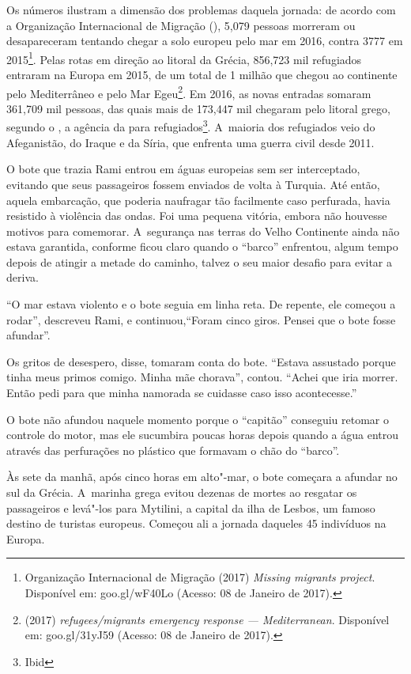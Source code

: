 Os números ilustram a dimensão dos problemas daquela jornada: de acordo
com a Organização Internacional de Migração (), 5,079 pessoas
morreram ou desapareceram tentando chegar a solo europeu pelo mar em
2016, contra 3777 em 2015\footnote{ Organização Internacional de Migração (2017)
\emph{Missing migrants project}. Disponível em:
{goo.gl/wF40Lo}
(Acesso: 08 de Janeiro de 2017).}. Pelas rotas em direção ao
litoral da Grécia, 856,723 mil refugiados entraram na Europa em 2015, de
um total de 1 milhão que chegou ao continente pelo Mediterrâneo e pelo
Mar Egeu\footnote{  (2017) \emph{ refugees/migrants emergency
response --- Mediterranean}. Disponível em:
goo.gl/31yJ59
(Acesso: 08 de Janeiro
de 2017).}. Em 2016, as novas entradas somaram 361,709
mil pessoas, das quais mais de 173,447 mil chegaram pelo litoral grego,
segundo o , a agência da  para refugiados\footnote{ Ibid}. A~maioria dos refugiados veio do Afeganistão,  do Iraque e da Síria, que enfrenta
uma guerra civil desde 2011.

O bote que trazia Rami entrou em águas europeias sem ser interceptado,
evitando que seus passageiros fossem enviados de volta à Turquia. Até
então, aquela embarcação, que poderia naufragar tão facilmente caso
perfurada, havia resistido à violência das ondas. Foi uma pequena
vitória, embora não houvesse motivos para comemorar. A~segurança nas
terras do Velho Continente ainda não estava garantida, conforme ficou
claro quando o ``barco'' enfrentou, algum tempo depois de atingir a
metade do caminho, talvez o seu maior desafio para evitar a deriva.

``O mar estava violento e o bote seguia em linha reta. De repente, ele
começou a rodar'', descreveu Rami, e continuou,``Foram cinco giros. Pensei que o
bote fosse afundar''.

Os gritos de desespero, disse, tomaram conta do bote. ``Estava assustado
porque tinha meus primos comigo. Minha mãe chorava'', contou.
``Achei que iria morrer. Então pedi para que minha namorada se cuidasse
caso isso acontecesse.''

O bote não afundou naquele momento porque o ``capitão'' conseguiu
retomar o controle do motor, mas ele sucumbira poucas horas depois
quando a água entrou através das perfurações no plástico que
formavam o chão do ``barco''.

Às sete da manhã, após cinco horas em alto"-mar, o bote começara a
afundar no sul da Grécia. A~marinha grega evitou dezenas de mortes ao
resgatar os passageiros e levá"-los para Mytilini, a capital da ilha de
Lesbos, um famoso destino de turistas europeus. Começou ali a jornada
daqueles 45 indivíduos na Europa.

